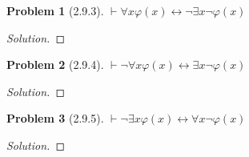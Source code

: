 \documentclass[letter]{article}
\newtheorem{problem}{Problem}
\theoremstyle{definition}
\newenvironment{solution}
{\begin{proof}[Solution]}
        {\end{proof}}
\renewcommand{\phi}{\varphi}
\begin{document}
\begin{problem}[2.9.3]
    $\vdash \forall x \phi(x) \leftrightarrow \neg \exists x \neg \phi(x)$
\end{problem}
\begin{solution}
\end{solution}

\begin{problem}[2.9.4]
    $\vdash \neg \forall x \phi(x) \leftrightarrow \exists x \neg \phi(x)$
\end{problem}
\begin{solution}
\end{solution}

\begin{problem}[2.9.5]
    $\vdash \neg \exists x \phi(x) \leftrightarrow \forall x \neg \phi(x)$
\end{problem}
\begin{solution}
\end{solution}
\end{document}
